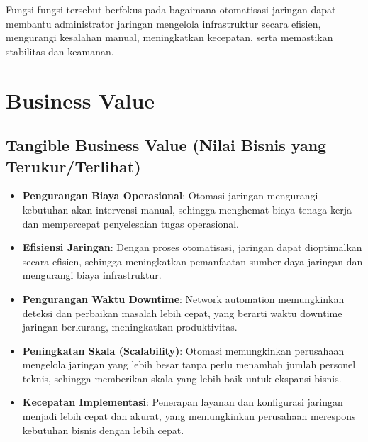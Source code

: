 Fungsi-fungsi tersebut berfokus pada bagaimana otomatisasi jaringan dapat membantu administrator jaringan mengelola infrastruktur secara efisien, mengurangi kesalahan manual, meningkatkan kecepatan, serta memastikan stabilitas dan keamanan.

\section{Business Value}

\subsection{Tangible Business Value (Nilai Bisnis yang Terukur/Terlihat)}
\begin{itemize}
    \item \textbf{Pengurangan Biaya Operasional}: Otomasi jaringan mengurangi kebutuhan akan intervensi manual, sehingga menghemat biaya tenaga kerja dan mempercepat penyelesaian tugas operasional.
    \item \textbf{Efisiensi Jaringan}: Dengan proses otomatisasi, jaringan dapat dioptimalkan secara efisien, sehingga meningkatkan pemanfaatan sumber daya jaringan dan mengurangi biaya infrastruktur.
    \item \textbf{Pengurangan Waktu Downtime}: Network automation memungkinkan deteksi dan perbaikan masalah lebih cepat, yang berarti waktu downtime jaringan berkurang, meningkatkan produktivitas.
    \item \textbf{Peningkatan Skala (Scalability)}: Otomasi memungkinkan perusahaan mengelola jaringan yang lebih besar tanpa perlu menambah jumlah personel teknis, sehingga memberikan skala yang lebih baik untuk ekspansi bisnis.
    \item \textbf{Kecepatan Implementasi}: Penerapan layanan dan konfigurasi jaringan menjadi lebih cepat dan akurat, yang memungkinkan perusahaan merespons kebutuhan bisnis dengan lebih cepat.
\end{itemize}

